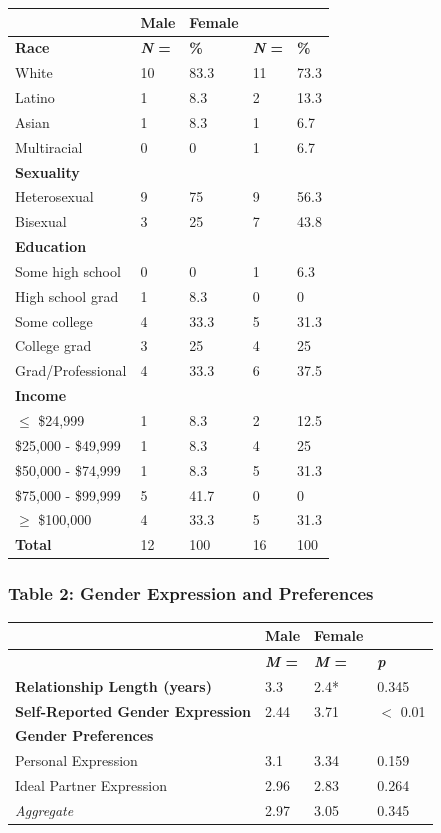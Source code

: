 \documentclass[twoside]{report}
\begin{document}
\begin{longtable}[]{@{}lllll@{}}
\toprule
& \textbf{Male} & \textbf{Female} & &\tabularnewline
\midrule
\endhead
\textbf{Race} & \textbf{\emph{N} =} & \textbf{\%} & \textbf{\emph{N} =}
& \textbf{\%}\tabularnewline
White & 10 & 83.3 & 11 & 73.3\tabularnewline
Latino & 1 & 8.3 & 2 & 13.3\tabularnewline
Asian & 1 & 8.3 & 1 & 6.7\tabularnewline
Multiracial & 0 & 0 & 1 & 6.7\tabularnewline
\textbf{Sexuality} & & & &\tabularnewline
Heterosexual & 9 & 75 & 9 & 56.3\tabularnewline
Bisexual & 3 & 25 & 7 & 43.8\tabularnewline
\textbf{Education} & & & &\tabularnewline
Some high school & 0 & 0 & 1 & 6.3\tabularnewline
High school grad & 1 & 8.3 & 0 & 0\tabularnewline
Some college & 4 & 33.3 & 5 & 31.3\tabularnewline
College grad & 3 & 25 & 4 & 25\tabularnewline
Grad/Professional & 4 & 33.3 & 6 & 37.5\tabularnewline
\textbf{Income} & & & &\tabularnewline
$\leq$ \$24,999 & 1 & 8.3 & 2 & 12.5\tabularnewline
\$25,000 - \$49,999 & 1 & 8.3 & 4 & 25\tabularnewline
\$50,000 - \$74,999 & 1 & 8.3 & 5 & 31.3\tabularnewline
\$75,000 - \$99,999 & 5 & 41.7 & 0 & 0\tabularnewline
$\geq$ \$100,000 & 4 & 33.3 & 5 & 31.3\tabularnewline
\textbf{Total} & 12 & 100 & 16 & 100\tabularnewline
\bottomrule
\end{longtable}

\hypertarget{table-2}{\subsubsection[Table 2: Gender Expression \texorpdfstring{\\}{} and
Preferences]{Table 2: Gender Expression and
Preferences}}

\begin{longtable}[]{@{}llll@{}}
\toprule
& \textbf{Male} & \textbf{Female} &\tabularnewline
\midrule
\endhead
& \textbf{\emph{M} =} & \textbf{\emph{M} =~} &
\emph{\textbf{p}}\tabularnewline
\textbf{Relationship Length (years)} & 3.3 & 2.4* & 0.345\tabularnewline
\textbf{Self-Reported Gender Expression} & 2.44 & 3.71 & $<$ 0.01\tabularnewline
\textbf{Gender Preferences} & & &\tabularnewline
Personal Expression & 3.1 & 3.34 & 0.159\tabularnewline
Ideal Partner Expression & 2.96 & 2.83 & 0.264\tabularnewline
\emph{Aggregate} & 2.97 & 3.05 & 0.345\tabularnewline
\bottomrule
\end{longtable}
\end{document}
